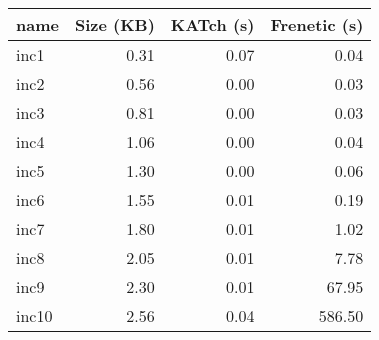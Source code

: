 \begin{tabular}{lrrr}
\toprule
name & Size (KB) & KATch (s) & Frenetic (s) \\
\midrule
inc1 & 0.31 & 0.07 & 0.04 \\
inc2 & 0.56 & 0.00 & 0.03 \\
inc3 & 0.81 & 0.00 & 0.03 \\
inc4 & 1.06 & 0.00 & 0.04 \\
inc5 & 1.30 & 0.00 & 0.06 \\
inc6 & 1.55 & 0.01 & 0.19 \\
inc7 & 1.80 & 0.01 & 1.02 \\
inc8 & 2.05 & 0.01 & 7.78 \\
inc9 & 2.30 & 0.01 & 67.95 \\
inc10 & 2.56 & 0.04 & 586.50 \\
\bottomrule
\end{tabular}
